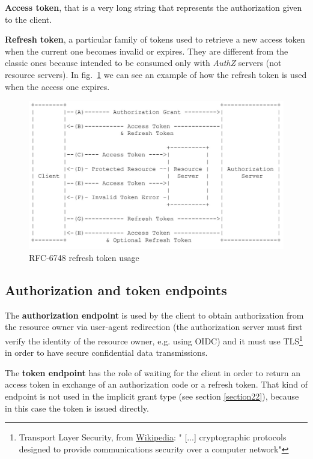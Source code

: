 \textbf{Access token}, that is a very long string that represents the authorization given to the client.

\textbf{Refresh token}, a particular family of tokens used to retrieve a new access token when the current one becomes invalid or expires. They are different from the classic ones because intended to be consumed only with \textit{AuthZ} servers (not resource servers). In fig.~\ref{fig:refreshtok} we can see an example of how the refresh token is used when the access one expires.



\begin{figure}
    \centering
    \includegraphics[scale=0.5]{chapters/images/chp2/tokenref.jpg}
    \caption{RFC-6748 refresh token usage}
    \label{fig:refreshtok}
\end{figure}

\vspace{1cm}

\subsection{Authorization and token endpoints}
The \textbf{authorization endpoint} is used by the client to obtain authorization from the resource owner via user-agent redirection (the authorization server must first verify the identity of the resource owner, e.g. using OIDC) and it must use TLS\footnote{Transport Layer Security, from \href{https://en.wikipedia.org/wiki/Transport_Layer_Security}{Wikipedia}: " [...] cryptographic protocols designed to provide communications security over a computer network"} in order to have secure confidential data transmissions.

The \textbf{token endpoint} has the role of waiting for the client in order to return an access token in exchange of an authorization code or a refresh token. That kind of endpoint is not used in the implicit grant type (see section \ref{section22}), because in this case the token is issued directly.

